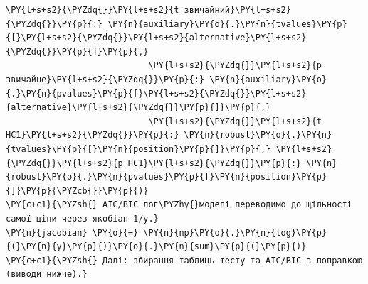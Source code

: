 \begin{Verbatim}[commandchars=\\\{\}]
                            \PY{l+s+s2}{\PYZdq{}}\PY{l+s+s2}{t звичайний}\PY{l+s+s2}{\PYZdq{}}\PY{p}{:} \PY{n}{auxiliary}\PY{o}{.}\PY{n}{tvalues}\PY{p}{[}\PY{l+s+s2}{\PYZdq{}}\PY{l+s+s2}{alternative}\PY{l+s+s2}{\PYZdq{}}\PY{p}{]}\PY{p}{,}
                            \PY{l+s+s2}{\PYZdq{}}\PY{l+s+s2}{p звичайне}\PY{l+s+s2}{\PYZdq{}}\PY{p}{:} \PY{n}{auxiliary}\PY{o}{.}\PY{n}{pvalues}\PY{p}{[}\PY{l+s+s2}{\PYZdq{}}\PY{l+s+s2}{alternative}\PY{l+s+s2}{\PYZdq{}}\PY{p}{]}\PY{p}{,}
                            \PY{l+s+s2}{\PYZdq{}}\PY{l+s+s2}{t HC1}\PY{l+s+s2}{\PYZdq{}}\PY{p}{:} \PY{n}{robust}\PY{o}{.}\PY{n}{tvalues}\PY{p}{[}\PY{n}{position}\PY{p}{]}\PY{p}{,} \PY{l+s+s2}{\PYZdq{}}\PY{l+s+s2}{p HC1}\PY{l+s+s2}{\PYZdq{}}\PY{p}{:} \PY{n}{robust}\PY{o}{.}\PY{n}{pvalues}\PY{p}{[}\PY{n}{position}\PY{p}{]}\PY{p}{\PYZcb{}}\PY{p}{)}
\PY{c+c1}{\PYZsh{} AIC/BIC лог\PYZhy{}моделі переводимо до щільності самої ціни через якобіан 1/y.}
\PY{n}{jacobian} \PY{o}{=} \PY{n}{np}\PY{o}{.}\PY{n}{log}\PY{p}{(}\PY{n}{y}\PY{p}{)}\PY{o}{.}\PY{n}{sum}\PY{p}{(}\PY{p}{)}
\PY{c+c1}{\PYZsh{} Далі: збирання таблиць тесту та AIC/BIC з поправкою (виводи нижче).}
\end{Verbatim}
